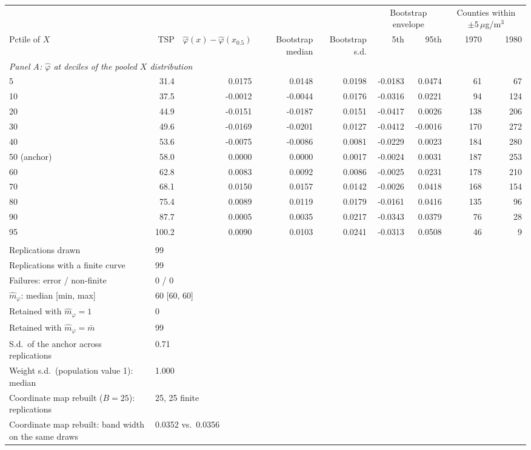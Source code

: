 \begin{tabular}{lrrrrrrrr}
\toprule
& & & & & \multicolumn{2}{c}{Bootstrap envelope} & \multicolumn{2}{c}{Counties within $\pm5\,\mu$g/m$^3$} \\
\cmidrule(lr){6-7} \cmidrule(lr){8-9}
Pctile of $X$ & TSP & $\hat\varphi(x)-\hat\varphi(x_{0.5})$ & Bootstrap median & Bootstrap s.d. & 5th & 95th & 1970 & 1980 \\
\midrule
\multicolumn{9}{l}{\textit{Panel A: $\hat\varphi$ at deciles of the pooled $X$ distribution}} \\
\midrule
5 & 31.4 & 0.0175 & 0.0148 & 0.0198 & -0.0183 & 0.0474 & 61 & 67 \\
10 & 37.5 & -0.0012 & -0.0044 & 0.0176 & -0.0316 & 0.0221 & 94 & 124 \\
20 & 44.9 & -0.0151 & -0.0187 & 0.0151 & -0.0417 & 0.0026 & 138 & 206 \\
30 & 49.6 & -0.0169 & -0.0201 & 0.0127 & -0.0412 & -0.0016 & 170 & 272 \\
40 & 53.6 & -0.0075 & -0.0086 & 0.0081 & -0.0229 & 0.0023 & 184 & 280 \\
50 (anchor) & 58.0 & 0.0000 & 0.0000 & 0.0017 & -0.0024 & 0.0031 & 187 & 253 \\
60 & 62.8 & 0.0083 & 0.0092 & 0.0086 & -0.0025 & 0.0231 & 178 & 210 \\
70 & 68.1 & 0.0150 & 0.0157 & 0.0142 & -0.0026 & 0.0418 & 168 & 154 \\
80 & 75.4 & 0.0089 & 0.0119 & 0.0179 & -0.0161 & 0.0416 & 135 & 96 \\
90 & 87.7 & 0.0005 & 0.0035 & 0.0217 & -0.0343 & 0.0379 & 76 & 28 \\
95 & 100.2 & 0.0090 & 0.0103 & 0.0241 & -0.0313 & 0.0508 & 46 & 9 \\
\addlinespace
\multicolumn{9}{l}{\textit{Panel B: multiplier design and convergence}} \\
\midrule
Replications drawn & \multicolumn{8}{l}{99} \\
Replications with a finite curve & \multicolumn{8}{l}{99} \\
Failures: error / non-finite & \multicolumn{8}{l}{0 / 0} \\
$\hat m_\varphi$: median [min, max] & \multicolumn{8}{l}{60 [60, 60]} \\
Retained with $\hat m_\varphi = 1$ & \multicolumn{8}{l}{0} \\
Retained with $\hat m_\varphi = \bar m$ & \multicolumn{8}{l}{99} \\
S.d.\ of the anchor across replications & \multicolumn{8}{l}{0.71} \\
Weight s.d.\ (population value 1): median & \multicolumn{8}{l}{1.000} \\
\addlinespace
Coordinate map rebuilt ($B=25$): replications & \multicolumn{8}{l}{25, 25 finite} \\
Coordinate map rebuilt: band width on the same draws & \multicolumn{8}{l}{0.0352 vs.\ 0.0356} \\
\bottomrule
\end{tabular}
